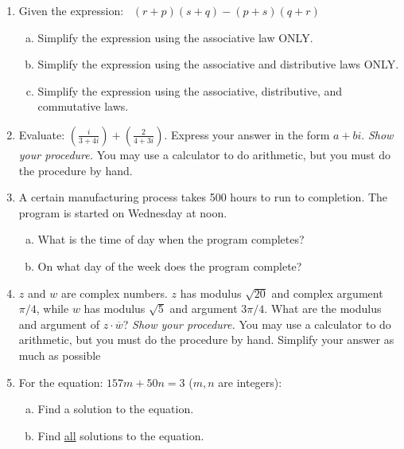 
\begin{enumerate}[(1)]

\item
Given the expression:~
 $(r+p)(s+q) - (p+s)(q+r)$
\begin{enumerate}[(a)]
\item
Simplify the expression using the associative law ONLY.
\item
Simplify the expression using the associative and distributive laws ONLY.
\item
Simplify the expression using the associative, distributive, and commutative laws.
\end{enumerate}

\item
Evaluate:  $\displaystyle{ \left(\frac{i}{3 + 4i} \right) +  \left(\frac{2}{4 + 3i} \right)} $. Express your answer in the form $a + bi$.
\emph{Show your procedure.}  You may use a calculator to do arithmetic, but you must do the procedure by hand.
\item
A certain manufacturing process takes 500 hours to run to completion. The program is started on Wednesday at noon.
\begin{enumerate}[(a)]
\item
What is the time of day when the program completes?
\item
On what day of the week does the program complete?
\end{enumerate}

\item
$z$ and $w$ are complex numbers. $z$ has modulus $\sqrt{20}$ and complex argument $\pi/4$, while $w$ has modulus $\sqrt{5}$ and argument $3\pi/4$.  What are the modulus and argument of $\displaystyle{z \cdot \overline{w}}$? \emph{Show your procedure.}  You may use a calculator to do arithmetic, but you must do the procedure by hand. Simplify your answer as much as possible

\item 
For the equation:  $157m + 50n = 3 $ ($m,n$ are integers):
\begin{enumerate}[(a)]
\item
Find a solution to the equation.
\item
Find \underline{all} solutions to the equation.
\end{enumerate}



\end{enumerate}
